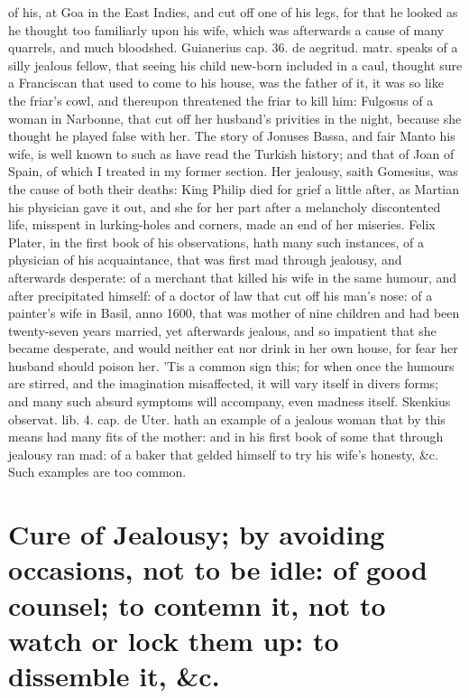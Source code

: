 {of his, at Goa in the East Indies, and cut off one of his legs,
for that he looked as he thought too familiarly upon his wife, which
was afterwards a cause of many quarrels, and much bloodshed. Guianerius
cap. 36. de aegritud. matr. speaks of a silly jealous fellow, that
seeing his child new-born included in a caul, thought sure a
Franciscan that used to come to his house, was the father of it,
it was so like the friar's cowl, and thereupon threatened the friar to
kill him: Fulgosus of a woman in Narbonne, that cut off her husband's
privities in the night, because she thought he played false with her.
The story of Jonuses Bassa, and fair Manto his wife, is well known to
such as have read the Turkish history; and that of Joan of Spain, of
which I treated in my former section. Her jealousy, saith Gomesius, was
the cause of both their deaths: King Philip died for grief a little
after, as Martian his physician gave it out, and she for her part
after a melancholy discontented life, misspent in lurking-holes and
corners, made an end of her miseries. Felix Plater, in the first book
of his observations, hath many such instances, of a physician of his
acquaintance, that was first mad through jealousy, and afterwards
desperate: of a merchant that killed his wife in the same humour,
and after precipitated himself: of a doctor of law that cut off his
man's nose: of a painter's wife in Basil, anno 1600, that was mother of
nine children and had been twenty-seven years married, yet afterwards
jealous, and so impatient that she became desperate, and would neither
eat nor drink in her own house, for fear her husband should poison her.
'Tis a common sign this; for when once the humours are stirred, and the
imagination misaffected, it will vary itself in divers forms; and many
such absurd symptoms will accompany, even madness itself. Skenkius
observat. lib. 4. cap. de Uter. hath an example of a jealous woman that
by this means had many fits of the mother: and in his first book of
some that through jealousy ran mad: of a baker that gelded himself to
try his wife's honesty, \&c. Such examples are too common.


\section[Cure of Jealousy: by avoiding it]{Cure of Jealousy; by avoiding occasions, not to be idle: of good counsel; to contemn it, not to watch or lock them up: to dissemble it, \&c.}

}
